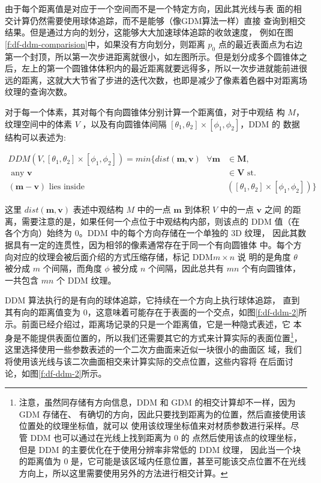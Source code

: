 由于每个距离值是对应于一个空间而不是一个特定方向，因此其光线与表 面的相交计算仍然需要使用球体追踪，而不是能够（像GDM算法一样）直接 查询到相交结果。但是通过方向的划分，这能够大大加速球体追踪的收敛速度， 例如在图\ref{f:df-ddm-comparision}中，如果没有方向划分，则距离 $p_0$ 点的最近表面点为右边第一个封顶，所以第一次步进距离就很小，如左图所示。但是划分成多个圆锥体之 后，左上的第一个圆锥体体积内的最近距离就要远得多，所以一次步进就能前进很远的距离，这就大大节省了步进的迭代次数，也即是减少了像素着色器中对距离场纹理的查询次数。

对于每一个体素，其对每个有向圆锥体分别计算一个距离值，对于中观结 构 $M$，纹理空间中的体素 $V$ ，以及有向圆锥体间隔 $[\theta_1, \theta_2] \times [\phi_1, \phi_2]$，DDM 的 数据结构可以表述为:

\begin{equation}
\begin{split}
	DDM(V,[\theta_{1},\theta_{2}]\times [\phi_{1},\phi_{2}])=min\{dist(\mathbf{m},\mathbf{v})\textrm{ }\forall\mathbf{m} & \in\mathbf{M},\\
	\textrm{ any } \mathbf{v} & \in\mathbf{V} \textrm{ st. } \\
	(\mathbf{m}-\mathbf{v}) \textrm{ lies inside }&([\theta_{1},\theta_{2}]\times [\phi_{1},\phi_{2}])\}
\end{split}
\end{equation}

这里 $dist(\mathbf{m}, \mathbf{v})$ 表述中观结构 $M$ 中的一点 $\mathbf{m}$ 到体积 $V$ 中的一点 $\mathbf{v}$ 之间 的距离，需要注意的是，如果任何一个点位于中观结构内部，则该点的 DDM 值（在各个方向）始终为 0。DDM 中的每个方向存储在一个单独的 3D 纹理， 因此其数据具有一定的连贯性，因为相邻的像素通常存在于同一个有向圆锥体 中。每个方向对应的纹理会被后面介绍的方式压缩存储，标记 DDM$m\times n$ 说 明的是角度 $\theta$ 被分成 $m$ 个间隔，而角度 $\phi$ 被分成 $n$ 个间隔，因此总共有 $mn$ 个有向圆锥体，一共包含 $mn$ 个 DDM 纹理。

DDM 算法执行的是有向的球体追踪，它持续在一个方向上执行球体追踪， 直到其有向的距离值变为 0，这意味着可能存在于表面的一个交点，如图\ref{f:df-ddm-2}所 示。前面已经介绍过，距离场记录的只是一个距离值，它是一种隐式表述，它 本身是不能提供表面位置的，所以我们还需要其它的方式来计算实际的表面位置\footnote{注意，虽然同存储有方向信息，DDM 和 GDM 的相交计算却不一样，因为 GDM 存储在、 有确切的方向，因此只要找到距离为的位置，然后直接使用该位置处的纹理坐标值，就可以 使用该纹理坐标值来对材质参数进行采样。尽管 DDM 也可以通过在光线上找到距离为 0 的 点然后使用该点的纹理坐标，但是 DDM 的主要优化在于使用分辨率非常低的 DDM 纹理， 因此当一个块的距离值为 0 是，它可能是该区域内任意位置，甚至可能该交点位置不在光线 方向上，所以这里需要使用另外的方法进行相交计算。}，这里选择使用一些参数表述的一个二次方曲面来近似一块很小的曲面区 域，我们将使用该光线与该二次曲面相交来计算实际的交点位置，这些内容将 在后面讨论，如图\ref{f:df-ddm-2}所示。

